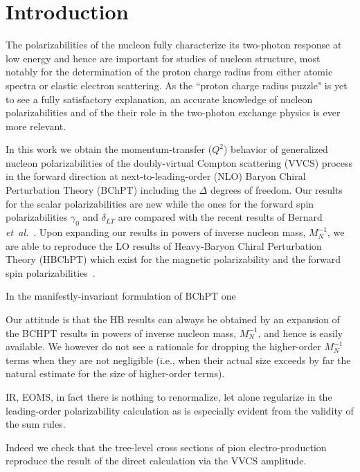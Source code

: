 \documentclass[prc,twocolumn,showpacs,preprintnumbers,amsmath,amssymb
,superscriptaddress,a4paper,nofootinbib
]{revtex4-1}
\begin{document}
\tableofcontents

\section{Introduction}

The polarizabilities of the nucleon fully characterize its two-photon response
at low energy and hence are important for studies of nucleon structure,
most notably for the determination of the proton charge radius from
either atomic spectra or elastic electron scattering. As the ``proton
charge radius puzzle" \cite{Pohl:2010zza,Pohl:2013yb} is yet to 
see a fully satisfactory explanation, 
an accurate knowledge of nucleon polarizabilities and of the their role
in the two-photon exchange physics is ever more relevant. 

In this work we obtain the momentum-transfer ($Q^2$) behavior of
generalized nucleon polarizabilities of the doubly-virtual Compton scattering (VVCS)
process in the forward direction at next-to-leading-order (NLO) Baryon
Chiral Perturbation Theory (BChPT) including the $\Delta$ degrees of freedom.   Our results for the scalar
polarizabilities are new while the ones for the forward
spin polarizabilities $\gamma_0$ and $\delta_{LT}$ 
are compared with the recent results of
Bernard {\it et~al.}~\cite{Bernard:2012hb}. 
Upon expanding our results in powers of inverse nucleon mass, $M_N^{-1}$, we are able to reproduce the LO results
of Heavy-Baryon Chiral Perturbation Theory (HBChPT) 
which exist for the magnetic polarizability \cite{Birse:2012eb} 
and the forward spin polarizabilities~\cite{Kao:2002cp}.

In the manifestly-invariant formulation of BChPT one 

Our attitude is that the HB results can always be obtained by an expansion
of the BCHPT results in powers of inverse nucleon mass, $M_N^{-1}$, and
hence is easily available. We however do not see a rationale for
dropping the higher-order $M_N^{-1}$ terms when they are not 
negligible (i.e., when their actual size exceeds by far the natural estimate
for the size of higher-order terms).

IR, EOMS, in fact there is nothing to renormalize, let alone regularize
in the leading-order polarizability calculation as is especially evident from the validity of the sum rules.

Indeed we check that the tree-level cross sections of pion electro-production reproduce the result of the direct calculation via the VVCS amplitude.
\end{document}

